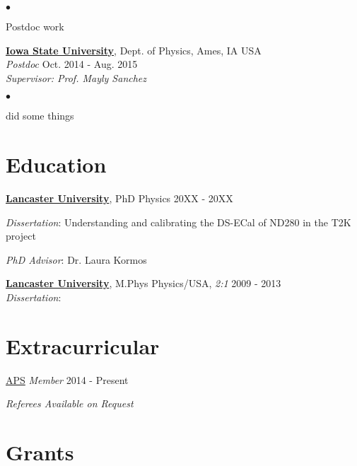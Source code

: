 \documentclass[margin, line]{res}
\newcommand{\ISU}{https://www.physastro.iastate.edu/}
\newcommand{\Lancs}{https://www.lancaster.ac.uk/physics/}
\newcommand{\APS}{https://www.aps.org/}
\newenvironment{list1}{
	\begin{list}{\ding{113}}{%
		\setlength{\itemsep}{0in}
		\setlength{\parsep}{0in} \setlength{\parskip}{0in}
		\setlength{\topsep}{0in} \setlength{\partopsep}{0in}
		\setlength{\leftmargin}{0.17in}}}{\end{list}}
\newenvironment{list2}{
	\begin{list}{$\bullet$}{%
		\setlength{\itemsep}{0in}
		\setlength{\parsep}{0in} \setlength{\parskip}{0in}
		\setlength{\topsep}{0in} \setlength{\partopsep}{0in}
		\setlength{\leftmargin}{0.2in}}}{\end{list}}
\begin{document}
\begin{resume}
\begin{list2}
\item Postdoc work
\end{list2}

{\bf \href{\ISU}{Iowa State University}},
	Dept. of Physics, Ames, IA USA \\
\vspace{-.3cm}
{\em Postdoc}
	\hfill{ Oct. 2014 - Aug. 2015}\\
{\em Supervisor: Prof. Mayly Sanchez}\\

\begin{list2}
    \item did some things
\end{list2}

\section{\sc Education}
{\bf \href{\Lancs}{Lancaster University}}, PhD Physics \hfill {20XX - 20XX}
\\
    \begin{list1}
		\item[] \emph{Dissertation}: Understanding and calibrating the DS-ECal of ND280 in the T2K project
		\item[] \emph{PhD Advisor}: Dr. Laura Kormos
	\end{list1}

{\bf \href{\Lancs}{Lancaster University}}, M.Phys Physics/USA, \textit{2:1}
\hfill {2009 - 2013}
\\
	\vspace*{-.15in}
    \emph{Dissertation}:  \\
                
\vspace{0.15in}

\vspace{0.0in}
\section{\sc Extracurricular}
{\href{\APS}{APS}}
\vspace*{-.0in}
{\em Member} \hfill { 2014 - Present} \\
\vspace*{-0.3in}



\vspace{0.2in}
\centerline{\emph{Referees Available on Request}}

\section{\sc Grants}

\end{resume}
\end{document}
